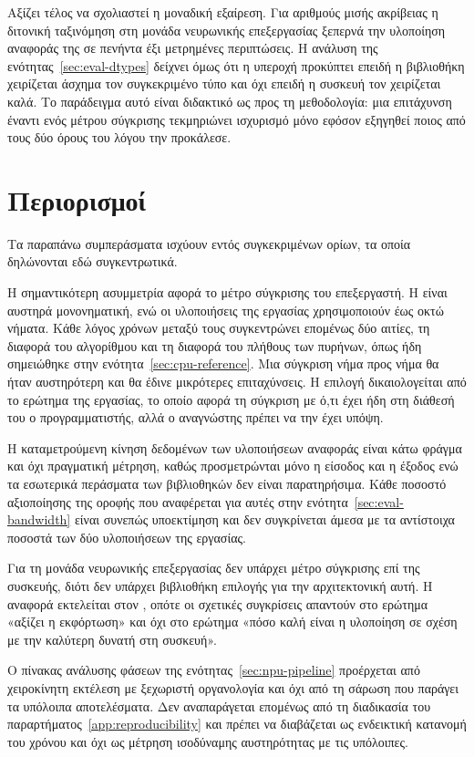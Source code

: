 Αξίζει τέλος να σχολιαστεί η μοναδική εξαίρεση. Για αριθμούς μισής ακρίβειας η
διτονική ταξινόμηση στη μονάδα νευρωνικής επεξεργασίας ξεπερνά την υλοποίηση
αναφοράς της σε πενήντα έξι μετρημένες περιπτώσεις. Η ανάλυση της
ενότητας~\ref{sec:eval-dtypes} δείχνει όμως ότι η υπεροχή προκύπτει επειδή η
βιβλιοθήκη χειρίζεται άσχημα τον συγκεκριμένο τύπο και όχι επειδή η συσκευή τον
χειρίζεται καλά. Το παράδειγμα αυτό είναι διδακτικό ως προς τη μεθοδολογία: μια
επιτάχυνση έναντι ενός μέτρου σύγκρισης τεκμηριώνει ισχυρισμό μόνο εφόσον
εξηγηθεί ποιος από τους δύο όρους του λόγου την προκάλεσε.

\section{Περιορισμοί}
\label{sec:concl-limitations}

Τα παραπάνω συμπεράσματα ισχύουν εντός συγκεκριμένων ορίων, τα οποία δηλώνονται
εδώ συγκεντρωτικά.

Η σημαντικότερη ασυμμετρία αφορά το μέτρο σύγκρισης του επεξεργαστή. Η
 είναι αυστηρά μονονηματική, ενώ οι υλοποιήσεις της
εργασίας χρησιμοποιούν έως οκτώ νήματα. Κάθε λόγος χρόνων μεταξύ τους
συγκεντρώνει επομένως δύο αιτίες, τη διαφορά του αλγορίθμου και τη διαφορά του
πλήθους των πυρήνων, όπως ήδη σημειώθηκε στην ενότητα~\ref{sec:cpu-reference}.
Μια σύγκριση νήμα προς νήμα θα ήταν αυστηρότερη και θα έδινε μικρότερες
επιταχύνσεις. Η επιλογή δικαιολογείται από το ερώτημα της εργασίας, το οποίο
αφορά τη σύγκριση με ό,τι έχει ήδη στη διάθεσή του ο προγραμματιστής, αλλά ο
αναγνώστης πρέπει να την έχει υπόψη.

Η καταμετρούμενη κίνηση δεδομένων των υλοποιήσεων αναφοράς είναι κάτω φράγμα και
όχι πραγματική μέτρηση, καθώς προσμετρώνται μόνο η είσοδος και η έξοδος ενώ τα
εσωτερικά περάσματα των βιβλιοθηκών δεν είναι παρατηρήσιμα. Κάθε ποσοστό
αξιοποίησης της οροφής που αναφέρεται για αυτές στην
ενότητα~\ref{sec:eval-bandwidth} είναι συνεπώς υποεκτίμηση και δεν συγκρίνεται
άμεσα με τα αντίστοιχα ποσοστά των δύο υλοποιήσεων της εργασίας.

Για τη μονάδα νευρωνικής επεξεργασίας δεν υπάρχει μέτρο σύγκρισης επί της
συσκευής, διότι δεν υπάρχει βιβλιοθήκη επιλογής  για την αρχιτεκτονική
αυτή. Η αναφορά εκτελείται στον , οπότε οι σχετικές συγκρίσεις
απαντούν στο ερώτημα «αξίζει η εκφόρτωση» και όχι στο ερώτημα «πόσο καλή είναι η
υλοποίηση σε σχέση με την καλύτερη δυνατή στη συσκευή».

Ο πίνακας ανάλυσης φάσεων της ενότητας~\ref{sec:npu-pipeline} προέρχεται από
χειροκίνητη εκτέλεση με ξεχωριστή οργανολογία και όχι από τη σάρωση που παράγει
τα υπόλοιπα αποτελέσματα. Δεν αναπαράγεται επομένως από τη διαδικασία του
παραρτήματος~\ref{app:reproducibility} και πρέπει να διαβάζεται ως ενδεικτική
κατανομή του χρόνου και όχι ως μέτρηση ισοδύναμης αυστηρότητας με τις υπόλοιπες.

